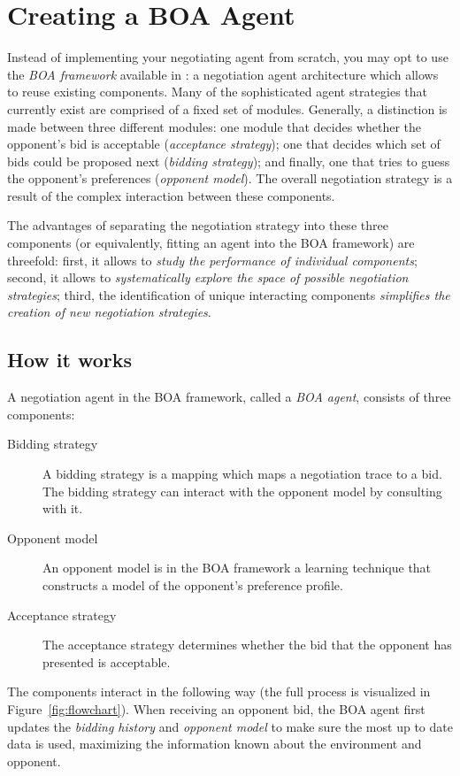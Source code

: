 \documentclass[]{article}
\begin{document}
\section{Creating a BOA Agent}\label{sec:boa}
Instead of implementing your negotiating agent from scratch, you may opt to use the \textit{BOA framework} available in \Genius: a negotiation agent architecture which allows to reuse existing components. Many of the sophisticated agent strategies that currently exist are comprised of a fixed set of modules. Generally, a distinction is made between three different modules: one module that decides whether the opponent's bid is acceptable (\textit{acceptance strategy}); one that decides which set of bids could be proposed next (\textit{bidding strategy}); and finally, one that tries to guess the opponent's preferences (\textit{opponent model}). The overall negotiation strategy is a result of the complex interaction between these components.

The advantages of separating the negotiation strategy into these three components (or equivalently, fitting an agent into the BOA framework) are threefold: first, it allows to \textit{study the performance of individual components}; second, it allows to \textit{systematically explore the space of possible negotiation strategies}; third, the identification of unique interacting components \textit{simplifies the creation of new negotiation strategies}.

\subsection{How it works}
A negotiation agent in the BOA framework, called a \textit{BOA agent}, consists of three components:
\begin{description}
  \item[Bidding strategy] A bidding strategy is a mapping which maps a negotiation trace to a bid. The bidding strategy can interact with the opponent model by consulting with it.%

  \item[Opponent model] An opponent model is in the BOA framework a learning technique that constructs a model of the opponent's preference profile.%
  \item[Acceptance strategy] The acceptance strategy determines whether the bid that the opponent has presented is acceptable.
\end{description}
The components interact in the following way (the full process is visualized in Figure~\ref{fig:flowchart}). When receiving an opponent bid, the BOA agent first updates the \textit{bidding history} and \textit{opponent model} to make sure the most up to date data is used, maximizing the information known about the environment and opponent.
\end{document}
